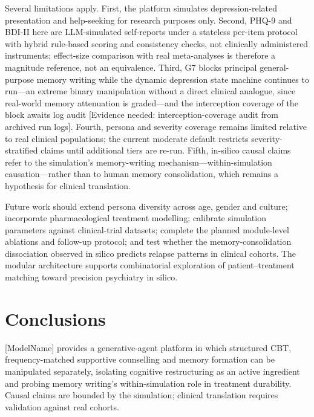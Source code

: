 \documentclass[sn-nature,pdflatex]{sn-jnl}
\begin{document}
Several limitations apply. First, the platform simulates depression-related presentation and help-seeking for research purposes only. Second, PHQ-9 and BDI-II here are LLM-simulated self-reports under a stateless per-item protocol with hybrid rule-based scoring and consistency checks, not clinically administered instruments; effect-size comparison with real meta-analyses is therefore a magnitude reference, not an equivalence. Third, G7 blocks principal general-purpose memory writing while the dynamic depression state machine continues to run---an extreme binary manipulation without a direct clinical analogue, since real-world memory attenuation is graded---and the interception coverage of the block awaits log audit [Evidence needed: interception-coverage audit from archived run logs]. Fourth, persona and severity coverage remains limited relative to real clinical populations; the current moderate default restricts severity-stratified claims until additional tiers are re-run. Fifth, in-silico causal claims refer to the simulation's memory-writing mechanism---within-simulation causation---rather than to human memory consolidation, which remains a hypothesis for clinical translation.

Future work should extend persona diversity across age, gender and culture; incorporate pharmacological treatment modelling; calibrate simulation parameters against clinical-trial datasets; complete the planned module-level ablations and follow-up protocol; and test whether the memory-consolidation dissociation observed in silico predicts relapse patterns in clinical cohorts. The modular architecture supports combinatorial exploration of patient--treatment matching toward precision psychiatry in silico.

\section{Conclusions}\label{sec:conclusions}

[ModelName] provides a generative-agent platform in which structured CBT, frequency-matched supportive counselling and memory formation can be manipulated separately, isolating cognitive restructuring as an active ingredient and probing memory writing's within-simulation role in treatment durability. Causal claims are bounded by the simulation; clinical translation requires validation against real cohorts.
\end{document}
